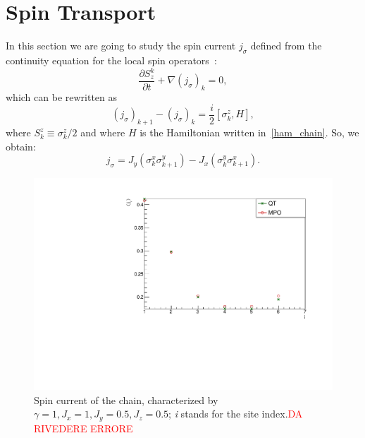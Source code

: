 \section{Spin Transport}
In this section we are going to study the spin current $j_\sigma$ defined from the continuity equation for the local spin operators~\cite{BenentiCasatiProsenRossini}:
\begin{equation}
    \frac{\partial S^k_z}{\partial t} + \nabla (j_\sigma)_k = 0,
\end{equation}
which can be rewritten as
\begin{equation}
    (j_\sigma)_{k+1}-(j_\sigma)_k = \frac{i}{2}[\sigma_k^z , H],
\end{equation}
where $S_k^z \equiv \sigma_k^z/2$ and where $H$ is the Hamiltonian written in~\ref{ham_chain}. So, we obtain:
\begin{equation}
    j_\sigma = J_y (\sigma_k^x \sigma_{k+1}^y) - J_x (\sigma_k^y \sigma_{k+1}^x). 
\end{equation}


\begin{figure}[H]
    \centering
    \includegraphics[scale=0.7]{Figures/8sites/SpinCurr_8s_J10505.pdf}
    \caption{Spin current of the chain, characterized by $\gamma=1, J_x=1, J_y=0.5, J_z=0.5$; \emph{i} stands for the site index.\textcolor{red}{DA RIVEDERE ERRORE}}
    \label{fig:my_label}
\end{figure}

